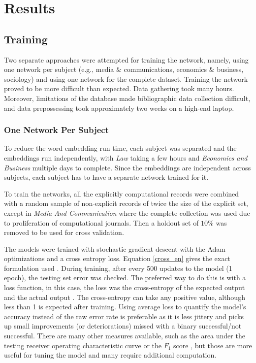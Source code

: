 \documentclass[12pt, a4paper]{article}
\begin{document}
\section{Results}

\subsection{Training}

 Two separate approaches were attempted for training the network, namely, using one network per subject (e.g., media \& communications, economics \& business, sociology) and using one network for the complete dataset. Training the network proved to be more difficult than expected. Data gathering took many hours. Moreover, limitations of the database made bibliographic data collection difficult, and data prepossessing took approximately two weeks on a high-end laptop.  

\subsubsection{One Network Per Subject}

To reduce the word embedding run time, each subject was separated and the embeddings run independently, with \textit{Law} taking a few hours and \textit{Economics and Business} multiple days to complete. Since the embeddings are independent across subjects, each subject has to have a separate network trained for it.

To train the networks, all the explicitly computational records were combined with a random sample of non-explicit records of twice the size of the explicit set, except in \textit{Media And Communication} where the complete collection was used due to proliferation of computational journals. Then a holdout set of $10\%$ was removed to be used for cross validation.

The models were trained with stochastic gradient descent with the Adam optimizations \citep{collins2012advertiser} and a cross entropy loss. Equation \ref{cross_en} gives the exact formulation used \citep{pytorch}. During training, after every 500 updates to the model (1 epoch), the testing set error was checked. The preferred way to do this is with a loss function, in this case, the loss \citep{deeploss} was the cross-entropy of the expected output and the actual output . The cross-entropy can take any positive value, although less than 1 is expected after training. Using average loss to quantify the model's accuracy instead of the raw error rate is preferable as it is less jittery \citep{deeploss} and picks up small improvements (or deteriorations) missed with a binary successful/not successful. There are many other measures available, such as the area under the testing receiver operating characteristic curve or the $F_1$ score \citep{james2013introduction}, but those are more useful for tuning the model and many require additional computation.
\end{document}

